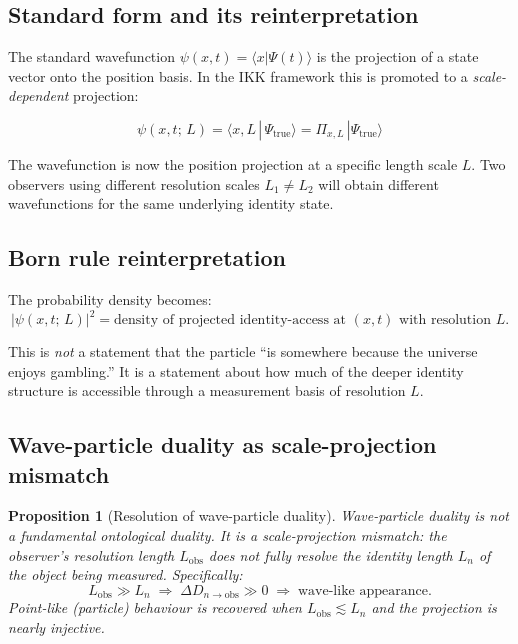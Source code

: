 \documentclass[11pt, a4paper, oneside]{article}
\theoremstyle{definition}
\theoremstyle{plain}
\newtheorem{proposition}{Proposition}[section]
\theoremstyle{remark}
\newcommand{\Psitrue}{|\Psi_{\mathrm{true}}\rangle}
\begin{document}
\subsection{Standard form and its reinterpretation}

The standard wavefunction $\psi(x,t) = \langle x|\Psi(t)\rangle$
is the projection of a state vector onto the position basis.
In the IKK framework this is promoted to a \emph{scale-dependent} projection:

\begin{equation}
  \boxed{
    \psi(x,t;\,L) = \langle x, L\,|\,\Psi_{\mathrm{true}}\rangle
    = \Pi_{x,L}\,\Psitrue
  }
  \label{eq:wf_scale}
\end{equation}

The wavefunction is now the position projection at a specific length scale $L$.
Two observers using different resolution scales $L_1 \neq L_2$ will obtain
different wavefunctions for the same underlying identity state.

\subsection{Born rule reinterpretation}

The probability density becomes:
\begin{equation}
  |\psi(x,t;\,L)|^2
  = \text{density of projected identity-access at } (x,t)
    \text{ with resolution } L.
  \label{eq:Born}
\end{equation}

This is \emph{not} a statement that the particle ``is somewhere because
the universe enjoys gambling.''
It is a statement about how much of the deeper identity structure
is accessible through a measurement basis of resolution $L$.

\subsection{Wave-particle duality as scale-projection mismatch}

\begin{proposition}[Resolution of wave-particle duality]
  Wave-particle duality is not a fundamental ontological duality.
  It is a \emph{scale-projection mismatch}: the observer's resolution
  length $L_\mathrm{obs}$ does not fully resolve the identity length
  $L_n$ of the object being measured.
  Specifically:
  \begin{equation}
    L_\mathrm{obs} \gg L_n
    \;\Longrightarrow\;
    \Delta D_{n \to \mathrm{obs}} \gg 0
    \;\Longrightarrow\;
    \text{wave-like appearance.}
    \label{eq:duality}
  \end{equation}
  Point-like (particle) behaviour is recovered when
  $L_\mathrm{obs} \lesssim L_n$ and the projection is nearly injective.
\end{proposition}
\end{document}
